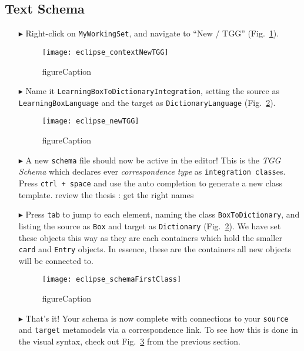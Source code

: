 \newpage
\hypertarget{schema tex}{}
\subsection{Text Schema}
\texHeader


\begin{itemize}

\item[$\blacktriangleright$] Right-click on \texttt{MyWorkingSet}, and navigate to ``New / TGG'' (Fig.~\ref{fig:contextTGG}).

\begin{figure}[htbp]
\begin{center}
  \texttt{[image: eclipse\_contextNewTGG]}
  \caption{figureCaption}
  \label{fig:contextTGG}
\end{center}
\end{figure}

\item[$\blacktriangleright$] Name it \texttt{LearningBoxToDictionaryIntegration}, setting the source as \texttt{LearningBoxLanguage} and the target as
\texttt{DictionaryLanguage} (Fig.~\ref{fig:newTGG}).

\begin{figure}[htbp]
\begin{center}
  \texttt{[image: eclipse\_newTGG]}
  \caption{figureCaption}
  \label{fig:newTGG}
\end{center}
\end{figure}

\item[$\blacktriangleright$] A new \texttt{schema} file should now be active in the editor! This is the \emph{TGG Schema} which declares ever
\emph{correspondence type} as \texttt{integration class}es. Press \texttt{ctrl + space} and use the auto completion to generate a new class template. \update
review the thesis : get the right names

\item[$\blacktriangleright$] Press \texttt{tab} to jump to each element, naming the class \texttt{BoxToDictionary}, and listing the source as \texttt{Box}
and target as \texttt{Dictionary} (Fig.~\ref{fig:newTGG}). We have set these objects this way as they are each containers which hold the smaller \texttt{card}
and \texttt{Entry} objects. In essence, these are the containers all new objects will be connected to.

\begin{figure}[htbp]
\begin{center}
  \texttt{[image: eclipse\_schemaFirstClass]}
  \caption{figureCaption}
  \label{fig:firstCorrType}
\end{center}
\end{figure}

\item[$\blacktriangleright$] That's it! Your schema is now complete with connections to your \texttt{source} and \texttt{target} metamodels via a correspondence
link. To see how this is done in the visual syntax, check out Fig.~\ref{fig:firstCorrType} from the previous section.

\end{itemize}
